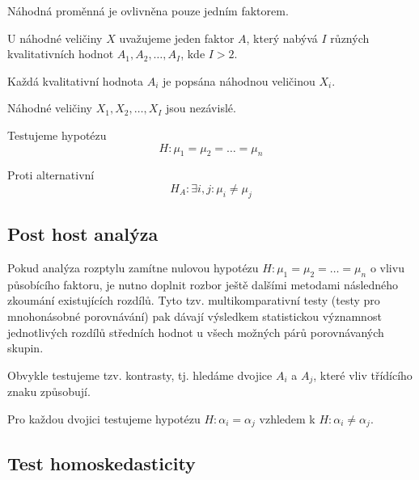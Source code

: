 \begin{compactitem}
    \item Náhodná proměnná je ovlivněna pouze jedním faktorem.

    \item U náhodné veličiny $X$ uvažujeme jeden faktor $A$, který nabývá $I$ různých kvalitativních
    hodnot $A_1, A_2, \ldots, A_I$, kde $I > 2$. \begin{compactitem}

        \item Každá kvalitativní hodnota $A_i$ je popsána náhodnou veličinou $X_i$.

        \item Náhodné veličiny $X_1, X_2, \ldots, X_I$ jsou nezávislé.
    \end{compactitem}

    \item Testujeme hypotézu
    $$ H : \mu_1 = \mu_2 = \ldots = \mu_n $$

    \item Proti alternativní
    $$ H_A : \exists i, j : \mu_i \not= \mu_j $$
\end{compactitem}

\subsection{Post host analýza}

\begin{compactitem}
    \item Pokud analýza rozptylu zamítne nulovou hypotézu $ H : \mu_1 = \mu_2 = \ldots = \mu_n $ o vlivu působícího faktoru, je nutno doplnit rozbor ještě dalšími metodami následného zkoumání existujících rozdílů. Tyto tzv. multikomparativní testy (testy pro mnohonásobné porovnávání) pak dávají výsledkem statistickou významnost jednotlivých rozdílů středních hodnot u všech možných párů porovnávaných skupin.

    \item Obvykle testujeme tzv. kontrasty, tj. hledáme dvojice $A_i$ a $A_j$, které vliv třídícího znaku způsobují.

    \item Pro každou dvojici testujeme hypotézu $ H : \alpha_i = \alpha_j $ vzhledem k $ H : \alpha_i \not= \alpha_j $.
\end{compactitem}

\subsection{Test homoskedasticity}

